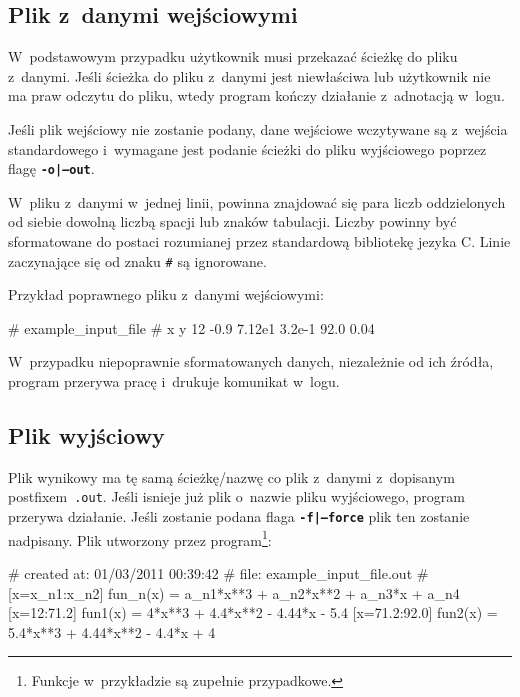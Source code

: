 \documentclass[12pt,a4paper]{article}
\newcommand{\prog}[1]{\texttt{#1}}
\newcommand{\flag}[1]{\textbf{\prog{#1}}}
\begin{document}
\subsection{Plik z~danymi wejściowymi}
\label{sec:plik_wejsciowy}

W~podstawowym przypadku użytkownik musi przekazać ścieżkę do pliku z~danymi.
Jeśli ścieżka do pliku z~danymi jest niewłaściwa lub użytkownik nie ma praw
odczytu do pliku, wtedy program kończy działanie z~adnotacją w~logu.

Jeśli plik wejściowy nie zostanie podany, dane wejściowe wczytywane są
z~wejścia standardowego i~wymagane jest podanie ścieżki do pliku wyjściowego
poprzez flagę \flag{-o|--out}.

W~pliku z~danymi w~jednej linii, powinna znajdować się para liczb oddzielonych
od siebie dowolną liczbą spacji lub znaków tabulacji. Liczby powinny być
sformatowane do postaci rozumianej przez standardową bibliotekę jezyka C.
Linie zaczynające się od znaku \prog{\#} są ignorowane.

Przykład poprawnego pliku z~danymi wejściowymi:
\vspace{-12pt}
\begin{SmallVerbatim}
    # example_input_file
    # x y
    12     -0.9
    7.12e1  3.2e-1  
    92.0    0.04
\end{SmallVerbatim}

W~przypadku niepoprawnie sformatowanych danych, niezależnie od ich źródła,
program przerywa pracę i~drukuje komunikat w~logu.

\subsection{Plik wyjściowy}
\label{sec:plik_wyjsciowy}

Plik wynikowy ma tę samą ścieżkę/nazwę co plik z~danymi z~dopisanym
postfixem~\prog{.out}. Jeśli isnieje już plik o~nazwie pliku wyjściowego,
program przerywa działanie. Jeśli zostanie podana flaga \flag{-f|--force}
plik ten zostanie nadpisany. Plik utworzony przez program\footnote{Funkcje
w~przykładzie są zupełnie przypadkowe.}:
\vspace{-12pt}
\begin{SmallVerbatim}
    # created at: 01/03/2011 00:39:42
    #       file: example_input_file.out
    # [x=x_{n1}:x_{n2}] fun_n(x) = a_{n1}*x**3 + a_{n2}*x**2 + a_{n3}*x + a_{n4}
    [x=12:71.2] fun1(x) = 4*x**3 + 4.4*x**2 - 4.44*x - 5.4
    [x=71.2:92.0] fun2(x) = 5.4*x**3 + 4.44*x**2 - 4.4*x + 4
\end{SmallVerbatim}
\end{document}
